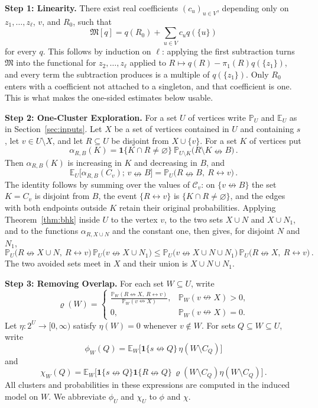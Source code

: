 \documentclass[11pt]{article}
\theoremstyle{definition}
\theoremstyle{remark}
\newcommand{\PP}{\mathbb P}
\newcommand{\EE}{\mathbb E}
\newcommand{\one}{\mathbf 1}
\newcommand{\con}{\leftrightarrow}
\newcommand{\ncon}{\nleftrightarrow}
\newcommand{\eC}{\mathcal C}
\newcommand{\Marg}{\mathfrak M}
\begin{document}
\medskip\noindent\textbf{Step 1: Linearity.}
There exist real coefficients $(c_u)_{u\in V}$, depending only on
$z_1,\dots,z_\ell$, $v$, and $R_0$, such that
\[
 \Marg[q]=q(R_0)+\sum_{u\in V}c_uq(\{u\})
\]
for every $q$. This follows by induction on $\ell$: applying the
first subtraction turns $\Marg$ into the functional for $z_2,\dots,z_\ell$ applied to
$R\mapsto q(R)-\pi_1(R)q(\{z_1\})$, and every term the subtraction produces is a multiple
of $q(\{z_1\})$. Only $R_0$ enters with a coefficient not attached to a singleton, and that
coefficient is one. This is what makes the one-sided estimates below usable.

\medskip\noindent\textbf{Step 2: One-Cluster Exploration.}
For a set $U$ of vertices write $\PP_U$ and $\EE_U$ as in Section~\ref{sec:inputs}. Let $X$
be a set of vertices contained in $U$ and containing $s$, let $v\in U\setminus X$, and let
$R\subseteq U$ be disjoint from $X\cup\{v\}$. For a set $K$ of vertices put
\begin{equation}\label{eq:alpha}
 \alpha_{R,B}(K)=\one\{K\cap R\neq\varnothing\}\ \PP_{U\setminus K}\bigl(R\setminus K\ncon
 B\bigr)\,.
\end{equation}
Then $\alpha_{R,B}(K)$ is increasing in $K$ and decreasing in $B$, and
\begin{equation}\label{eq:tower}
 \EE_U\bigl[\alpha_{R,B}(C_v);\,v\ncon B\bigr]=\PP_U\bigl(R\ncon B,\ R\con v\bigr)\,.
\end{equation}
The identity follows by summing over the values of $\eC_v$: on $\{v\ncon B\}$ the set
$K=C_v$ is disjoint from $B$, the event $\{R\con v\}$ is
$\{K\cap R\neq\varnothing\}$, and the edges with both endpoints outside $K$ retain their
original probabilities. Applying
Theorem~\ref{thm:bhk} inside $U$ to the vertex $v$, to the two sets $X\cup N$ and $X\cup
N_1$, and to the functions $\alpha_{R,X\cup N}$ and the constant one, then gives, for
disjoint $N$ and $N_1$,
\begin{equation}\label{eq:exch1}
 \PP_U\bigl(R\ncon X\cup N,\ R\con v\bigr)\,\PP_U\bigl(v\ncon X\cup N_1\bigr)
\leq \PP_U\bigl(v\ncon X\cup N\cup N_1\bigr)\,\PP_U\bigl(R\ncon X,\ R\con v\bigr)\,.
\end{equation}
The two avoided sets meet in $X$ and their union is $X\cup N\cup N_1$.

\medskip\noindent\textbf{Step 3: Removing Overlap.}
For each set $W\subseteq U$, write
\[
 \varrho(W)=
 \begin{cases}
 \displaystyle
 \frac{\PP_W(R\ncon X,\ R\con v)}{\PP_W(v\ncon X)},
     &\PP_W(v\ncon X)>0,\\[6pt]
 0,&\PP_W(v\ncon X)=0.
 \end{cases}
\]
Let $\eta:2^U\to[0,\infty)$ satisfy $\eta(W)=0$ whenever
$v\notin W$. For sets $Q\subseteq W\subseteq U$, write
\[
 \phi_W(Q)=\EE_W\bigl[\one\{s\ncon Q\}\,\eta(W\setminus C_Q)\bigr]
\]
and
\[
 \chi_W(Q)=\EE_W\bigl[\one\{s\ncon Q\}\one\{R\ncon Q\}\,
       \varrho(W\setminus C_Q)\eta(W\setminus C_Q)\bigr]\,.
\]
All clusters and probabilities in these expressions are computed in the induced model on
$W$. We abbreviate $\phi_U$ and $\chi_U$ to $\phi$ and $\chi$.
\end{document}
